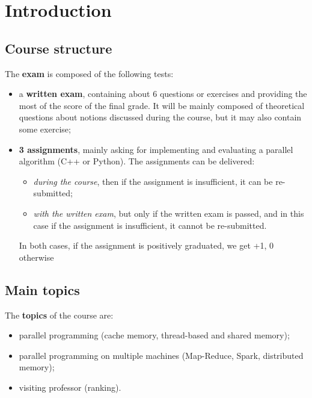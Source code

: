 \section{Introduction}

\subsection{Course structure}
The \textbf{exam} is composed of the following tests:

\begin{itemize}

    \item a \textbf{written exam}, containing about 6 questions or exercises and providing the most of the score of the final grade. It will be mainly composed of theoretical questions about notions discussed during the course, but it may also contain some exercise;
    
    \item \textbf{3 assignments}, mainly asking for implementing and evaluating a parallel algorithm (C++ or Python). The assignments can be delivered:

    \begin{itemize}
    
        \item \textit{during the course}, then if the assignment is insufficient, it can be re-submitted;
        
        \item \textit{with the written exam}, but only if the written exam is passed, and in this case if the assignment is insufficient, it cannot be re-submitted.
        
    \end{itemize}

    In both cases, if the assignment is positively graduated, we get +1, 0 otherwise
    
\end{itemize}

\subsection{Main topics}

The \textbf{topics} of the course are:

\begin{itemize}

    \item parallel programming (cache memory, thread-based and shared memory);
    
    \item parallel programming on multiple machines (Map-Reduce, Spark, 
    distributed memory);
    
    \item visiting professor (ranking).
    
\end{itemize}

